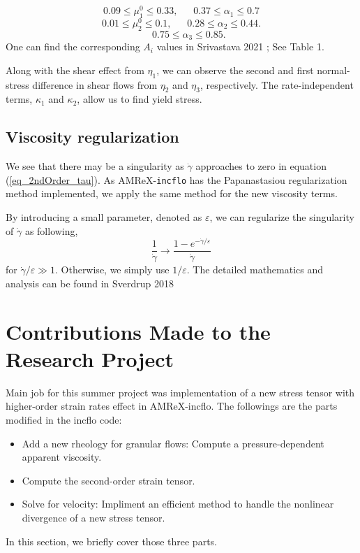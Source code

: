     \[
    0.09 \leq \mu_1^0 \leq 0.33, 
    \ \ \ \ \ \ \ 
    0.37 \leq \alpha_1 \leq 0.7
    \]
        \[
    0.01 \leq \mu_2^0 \leq 0.1, 
    \ \ \ \ \ \ \ 
    0.28 \leq \alpha_2 \leq 0.44.
    \]
            \[
    \ \ \ \ \ \ \ 
    0.75 \leq \alpha_3 \leq 0.85.
    \]
     One can find the corresponding $A_i$ values in Srivastava 2021 \cite{srivastava_viscometric_2021}; See Table 1.
\par
Along with the shear effect from $\eta_1$, we can observe the second and first normal-stress difference in shear flows from $\eta_2$ and $\eta_3$, respectively. The rate-independent terms, $\kappa_1$ and $\kappa_2$, allow us to find yield stress. 

\subsection{Viscosity regularization}
We see that there may be a singularity as $\dot{\gamma}$ approaches to zero in equation (\ref{eq_2ndOrder_tau}). 
As AMReX-\verb+incflo+ has the Papanastasiou regularization method implemented, we apply the same method for the new viscosity terms.
\par
By introducing a small parameter, denoted as $\varepsilon$, we can regularize the singularity of $\dot{\gamma}$ as following,
\[
  \frac{1}{\dot{\gamma}} \rightarrow \frac{1-e^{-\dot{\gamma} / \varepsilon}}{\dot{\gamma}}  
\]
for $\dot{\gamma}/\varepsilon \gg 1$. Otherwise, we simply use $1/\varepsilon$. 
The detailed mathematics and analysis can be found in Sverdrup 2018 \cite{sverdrup_highly_2018}
\section{Contributions Made to the Research Project}
Main job for this summer project was implementation of a new stress tensor with higher-order strain rates effect in AMReX-incflo. The followings are the parts modified in the incflo code: 
\begin{itemize}
	\item Add a new rheology for granular flows: Compute a pressure-dependent apparent viscosity.
	\item Compute the second-order strain tensor.
	\item Solve for velocity: Impliment an efficient method to handle the nonlinear divergence of a new stress tensor.
\end{itemize}
In this section, we briefly cover those three parts.
